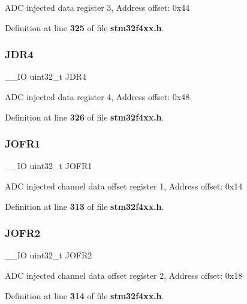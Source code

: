 A\+DC injected data register 3, Address offset\+: 0x44 

Definition at line \textbf{ 325} of file \textbf{ stm32f4xx.\+h}.

\mbox{\label{structADC__TypeDef_a9274ceea3b2c6d5c1903d0a7abad91a1}} 
\subsubsection{J\+D\+R4}
{\footnotesize\ttfamily \+\_\+\+\_\+\+IO uint32\+\_\+t J\+D\+R4}

A\+DC injected data register 4, Address offset\+: 0x48 

Definition at line \textbf{ 326} of file \textbf{ stm32f4xx.\+h}.

\mbox{\label{structADC__TypeDef_a427dda1678f254bd98b1f321d7194a3b}} 
\subsubsection{J\+O\+F\+R1}
{\footnotesize\ttfamily \+\_\+\+\_\+\+IO uint32\+\_\+t J\+O\+F\+R1}

A\+DC injected channel data offset register 1, Address offset\+: 0x14 

Definition at line \textbf{ 313} of file \textbf{ stm32f4xx.\+h}.

\mbox{\label{structADC__TypeDef_a11e65074b9f06b48c17cdfa5bea9f125}} 
\subsubsection{J\+O\+F\+R2}
{\footnotesize\ttfamily \+\_\+\+\_\+\+IO uint32\+\_\+t J\+O\+F\+R2}

A\+DC injected channel data offset register 2, Address offset\+: 0x18 

Definition at line \textbf{ 314} of file \textbf{ stm32f4xx.\+h}.

\mbox{\label{structADC__TypeDef_a613f6b76d20c1a513976b920ecd7f4f8}} 
